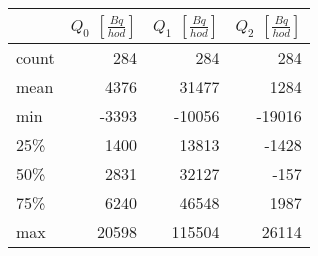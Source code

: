 \begin{tabular}{lrrr}
\toprule
{} &  $Q_0$ $\left[\si{\frac{Bq}{hod}}\right]$ &  $Q_1$ $\left[\si{\frac{Bq}{hod}}\right]$ &  $Q_2$ $\left[\si{\frac{Bq}{hod}}\right]$ \\
\midrule
count &                                       284 &                                       284 &                                       284 \\
mean  &                                      4376 &                                     31477 &                                      1284 \\
min   &                                     -3393 &                                    -10056 &                                    -19016 \\
25\%   &                                      1400 &                                     13813 &                                     -1428 \\
50\%   &                                      2831 &                                     32127 &                                      -157 \\
75\%   &                                      6240 &                                     46548 &                                      1987 \\
max   &                                     20598 &                                    115504 &                                     26114 \\
\bottomrule
\end{tabular}
